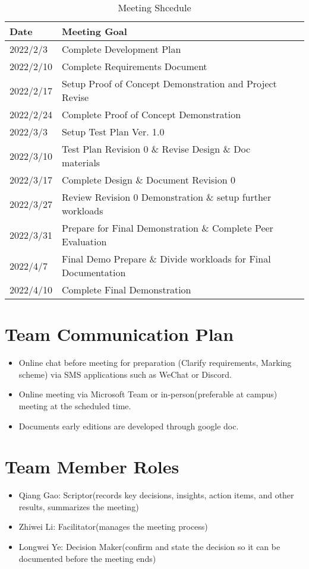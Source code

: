 \documentclass[11pt, letterpaper]{article}
\begin{document}
\begin{table}[hp]
	\caption{Meeting Shcedule}
	\begin{tabularx}{\textwidth}{llX}
	\toprule
	\textbf{Date} & \textbf{Meeting Goal}\\
	\midrule
	2022/2/3 & Complete Development Plan\\
	2022/2/10 & Complete Requirements Document\\
	2022/2/17 & Setup Proof of Concept Demonstration and Project Revise\\
	2022/2/24 & Complete Proof of Concept Demonstration\\
	2022/3/3 & Setup Test Plan Ver. 1.0\\
	2022/3/10 & Test Plan Revision 0 \& Revise Design \& Doc materials\\
	2022/3/17 & Complete Design \& Document Revision 0\\
	2022/3/27 & Review Revision 0 Demonstration \& setup further workloads\\
	2022/3/31 & Prepare for Final Demonstration \& Complete Peer Evaluation\\
	2022/4/7 & Final Demo Prepare \& Divide workloads for Final Documentation\\
	2022/4/10 & Complete Final Demonstration\\
	\bottomrule
	\end{tabularx}
\end{table}

\section{Team Communication Plan}
\begin{itemize}
	\item Online chat before meeting for preparation 
	(Clarify requirements, Marking scheme) via SMS applications such as WeChat or Discord.
	\item Online meeting via Microsoft Team or in-person(preferable at campus) meeting at the scheduled time.
	\item Documents early editions are developed through google doc.

\end{itemize}

\section{Team Member Roles}
\begin{itemize}
	\item Qiang Gao: Scriptor(records key decisions, insights, action items, and other results, summarizes the meeting)
	\item Zhiwei Li: Facilitator(manages the meeting process)
	\item Longwei Ye: Decision Maker(confirm and state the decision so it can be documented before the meeting ends)

\end{itemize}
\end{document}
